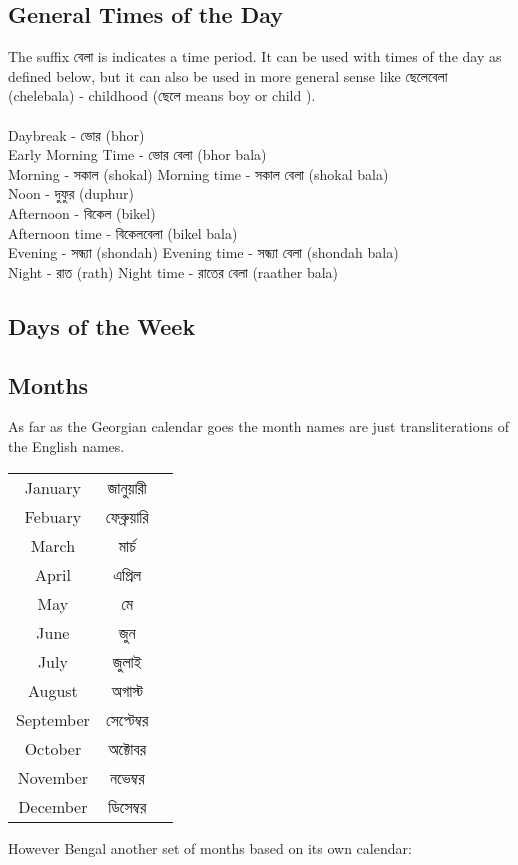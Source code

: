 \documentclass{article}
\begin{document}
\subsection{General Times of the Day}
The suffix বেলা is indicates a time period. It can be used with times of the day as defined below, but it can also be used in more general sense like ছেলেবেলা (chelebala) - childhood (ছেলে means boy or child ). \\
\\
Daybreak - ভোর (bhor) \\
Early Morning Time - ভোর বেলা (bhor bala) \\
Morning - সকাল (shokal)
Morning time -  সকাল বেলা (shokal bala) \\
Noon - দুফুর (duphur) \\
Afternoon - বিকেল (bikel) \\
Afternoon time - বিকেলবেলা (bikel bala) \\
Evening - সন্ধ্যা (shondah)
Evening time - সন্ধ্যা বেলা (shondah bala) \\
Night - রাত (rath)
Night time - রাতের বেলা (raather bala)  \\

\subsection{Days of the Week}

\subsection{Months}

As far as the Georgian calendar goes the month names are just transliterations of the English names. \\


\begin{center}
\begin{tabular}{ c c c }
 January & জানুয়ারী  \\ 
 Febuary & ফেব্রুয়ারি  \\  
 March & মার্চ     \\
 April & এপ্রিল    \\
 May & মে    \\
 June & জুন    \\
 July & জুলাই   \\
 August & অগাস্ট  \\
 September & সেপ্টেম্বর  \\
 October & অক্টোবর  \\
 November & নভেম্বর  \\
 December & ডিসেম্বর  
\end{tabular}
\end{center}

However Bengal another set of months based on its own calendar: \\
\end{document}
